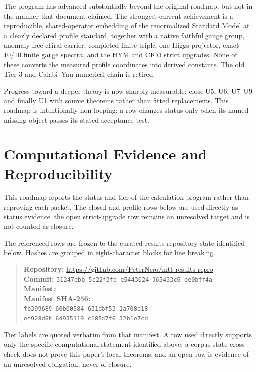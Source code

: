 \documentclass[11pt]{article}
\begin{document}
The program has advanced substantially beyond the original roadmap, but not in
the manner that document claimed. The strongest current achievement is a
reproducible, shared-operator embedding of the renormalized Standard Model at a
clearly declared profile standard, together with a native faithful gauge
group, anomaly-free chiral carrier, completed finite triple, one-Higgs
projector, exact 10/10 finite gauge spectra, and the HYM and CKM strict
upgrades. None of these converts the measured profile coordinates into
derived constants. The old Tier-3 and Calabi--Yau numerical chain is retired.

Progress toward a deeper theory is now sharply measurable: close U5, U6,
U7--U9 and finally U1 with source theorems rather than fitted replacements.
This roadmap is intentionally non-looping: a row changes status only when its
named missing object passes its stated acceptance test.

\section*{Computational Evidence and Reproducibility}
This roadmap reports the status and tier of the calculation program rather than reproving each packet. The closed and profile rows below are used directly as status evidence; the open strict-upgrade row remains an unresolved target and is not counted as closure.

The referenced rows are frozen to the curated results repository state identified below. Hashes are grouped in eight-character blocks for line breaking.
\begin{quote}\small
\textbf{Repository:} \url{https://github.com/PeterNero/mtt-results-repro}\\
\textbf{Commit:} \texttt{31247ebb 5c22f3fb b5443024 365433c6 ee0bff4a}\\
\textbf{Manifest:} \\
\textbf{Manifest SHA-256:}\\
\texttt{fb399689 60b00584 631dbf53 1a708e18}\\
\texttt{ef928d6b 6d935119 c185d7f6 32b1e7cd}
\end{quote}

Tier labels are quoted verbatim from that manifest. A row used directly supports only the specific computational statement identified above; a corpus-state cross-check does not prove this paper's local theorems; and an open row is evidence of an unresolved obligation, never of closure.
\end{document}
